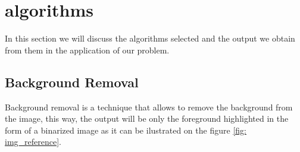 \documentclass[10pt]{article}
\begin{document}


\section{algorithms}
In this section we will discuss the algorithms selected and the output we obtain from them in the application of our problem.

\subsection{Background Removal} 
Background removal is a technique that allows to remove the background from the image, this way, the output will be only the foreground highlighted in the form of a binarized image as it can be ilustrated on the figure \ref{fig: img_reference}. 
\end{document}
